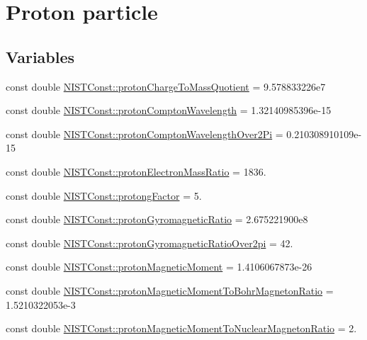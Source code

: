 \hypertarget{group___n_i_s_t_const-_proton}{}\section{Proton particle}
\label{group___n_i_s_t_const-_proton}
\subsection*{Variables}
\begin{DoxyCompactItemize}
\item 
const double \mbox{\hyperlink{group___n_i_s_t_const-_proton_ga59d127bca4ef5416e0e42c4d05c35a68}{N\+I\+S\+T\+Const\+::proton\+Charge\+To\+Mass\+Quotient}} = 9.\+578833226e7
\item 
const double \mbox{\hyperlink{group___n_i_s_t_const-_proton_ga79247734bd6f7409a382e17da7359680}{N\+I\+S\+T\+Const\+::proton\+Compton\+Wavelength}} = 1.\+32140985396e-\/15
\item 
const double \mbox{\hyperlink{group___n_i_s_t_const-_proton_gaedddad375441d4bf1013089ba0004da5}{N\+I\+S\+T\+Const\+::proton\+Compton\+Wavelength\+Over2\+Pi}} = 0.\+210308910109e-\/15
\item 
const double \mbox{\hyperlink{group___n_i_s_t_const-_proton_gae88fb4c421a252321d15b0f93ad19954}{N\+I\+S\+T\+Const\+::proton\+Electron\+Mass\+Ratio}} = 1836.
\item 
const double \mbox{\hyperlink{group___n_i_s_t_const-_proton_gafdc26fffabee1319028bd7f61d561be5}{N\+I\+S\+T\+Const\+::protong\+Factor}} = 5.
\item 
const double \mbox{\hyperlink{group___n_i_s_t_const-_proton_ga5e708f58aaae8033705f05bc13507873}{N\+I\+S\+T\+Const\+::proton\+Gyromagnetic\+Ratio}} = 2.\+675221900e8
\item 
const double \mbox{\hyperlink{group___n_i_s_t_const-_proton_ga54ecf0d1090a1b2c9f7b301add8904b0}{N\+I\+S\+T\+Const\+::proton\+Gyromagnetic\+Ratio\+Over2pi}} = 42.
\item 
const double \mbox{\hyperlink{group___n_i_s_t_const-_proton_ga931c9d53a62cee8eb68b4e930d0cf5a6}{N\+I\+S\+T\+Const\+::proton\+Magnetic\+Moment}} = 1.\+4106067873e-\/26
\item 
const double \mbox{\hyperlink{group___n_i_s_t_const-_proton_gab71f8e2de250b48e9bbac602b69999de}{N\+I\+S\+T\+Const\+::proton\+Magnetic\+Moment\+To\+Bohr\+Magneton\+Ratio}} = 1.\+5210322053e-\/3
\item 
const double \mbox{\hyperlink{group___n_i_s_t_const-_proton_gae8cd4187eb7069a37639787bf4b1305a}{N\+I\+S\+T\+Const\+::proton\+Magnetic\+Moment\+To\+Nuclear\+Magneton\+Ratio}} = 2.

\end{DoxyCompactItemize}
